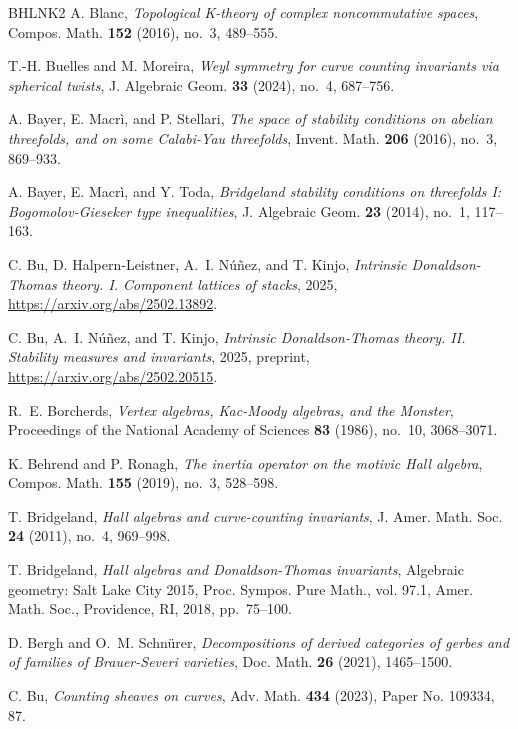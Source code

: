 \documentclass[12pt]{amsart}
\theoremstyle{definition}
\newcommand{\1}{\mathbf 1}
\begin{document}
\begin{thebibliography}{BHLNK2}
A. Blanc, \emph{Topological {K}-theory of complex noncommutative spaces}, Compos. Math. \textbf{152} (2016), no.~3, 489--555.

T.-H. Buelles and M. Moreira, \emph{Weyl symmetry for curve counting invariants via spherical twists}, J. Algebraic Geom. \textbf{33} (2024), no.~4, 687--756.

A. Bayer, E. Macr\`i, and P. Stellari, \emph{The space of stability conditions on abelian threefolds, and on some {C}alabi-{Y}au threefolds}, Invent. Math. \textbf{206} (2016), no.~3, 869--933.

A. Bayer, E. Macr\`i, and Y. Toda, \emph{Bridgeland stability conditions on threefolds {I}: {B}ogomolov-{G}ieseker type inequalities}, J. Algebraic Geom. \textbf{23} (2014), no.~1, 117--163.

C. Bu, D. Halpern-Leistner, A.~I. Núñez, and T. Kinjo, \emph{Intrinsic Donaldson-Thomas theory. I. Component lattices of stacks}, 2025, \url{https://arxiv.org/abs/2502.13892}.


C. Bu, A.~I. Núñez, and T. Kinjo, \emph{Intrinsic Donaldson-Thomas theory. II. Stability measures and invariants}, 2025, preprint, \url{https://arxiv.org/abs/2502.20515}.

R.~E. Borcherds, \emph{Vertex algebras, Kac-Moody algebras, and the Monster}, Proceedings of the National Academy of Sciences \textbf{83} (1986), no.~10, 3068--3071.

K. Behrend and P. Ronagh, \emph{The inertia operator on the motivic {H}all algebra}, Compos. Math. \textbf{155} (2019), no.~3, 528--598.

T. Bridgeland, \emph{Hall algebras and curve-counting invariants}, J. Amer. Math. Soc. \textbf{24} (2011), no.~4, 969--998.

T. Bridgeland, \emph{Hall algebras and {D}onaldson-{T}homas invariants}, Algebraic geometry: {S}alt {L}ake {C}ity 2015, Proc. Sympos. Pure Math., vol. 97.1, Amer. Math. Soc., Providence, RI, 2018, pp.~75--100.

D. Bergh and O.~M. Schn\"urer, \emph{Decompositions of derived categories of gerbes and of families of {B}rauer-{S}everi varieties}, Doc. Math. \textbf{26} (2021), 1465--1500.

C. Bu, \emph{Counting sheaves on curves}, Adv. Math. \textbf{434} (2023), Paper No. 109334, 87.


\end{thebibliography}
\end{document}
